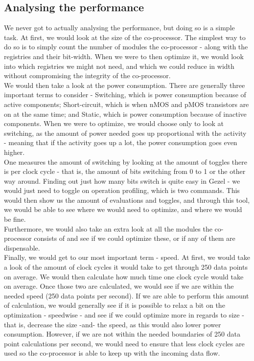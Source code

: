 \documentclass[12pt,a4paper]{article}
\begin{document}
\subsection{Analysing the performance}
	We never got to actually analysing the performance, but doing so is a simple task. At first, we would look at the size of the co-processor. The simplest way to do so is to simply count the number of modules the co-processor - along with the registries and their bit-width. When we were to then optimize it, we would look into which registries we might not need, and which we could reduce in width without compromising the integrity of the co-processor.\\
	We would then take a look at the power consumption. There are generally three important terms to consider - Switching, which is power consumption because of active components; Short-circuit, which is when nMOS and pMOS transistors are on at the same time; and Static, which is power consumption because of inactive components. When we were to optimize, we would choose only to look at switching, as the amount of power needed goes up proportional with the activity - meaning that if the activity goes up a lot, the power consumption goes even higher.\\
	One measures the amount of switching by looking at the amount of toggles there is per clock cycle - that is, the amount of bits switching from 0 to 1 or the other way around. Finding out just how many bits switch is quite easy in Gezel - we would just need to toggle on operation profiling, which is two commands. This would then show us the amount of evaluations and toggles, and through this tool, we would be able to see where we would need to optimize, and where we would be fine.\\
	Furthermore, we would also take an extra look at all the modules the co-processor consists of and see if we could optimize these, or if any of them are dispensable.\\
	Finally, we would get to our most important term - speed. At first, we would take a look of the amount of clock cycles it would take to get through 250 data points on average. We would then calculate how much time one clock cycle would take on average. Once those two are calculated, we would see if we are within the needed speed (250 data points per second). If we are able to perform this amount of calculation, we would generally see if it is possible to relax a bit on the optimization - speedwise - and see if we could optimize more in regards to size - that is, decrease the size -and- the speed, as this would also lower power consumption. However, if we are not within the needed boundaries of 250 data point calculations per second, we would need to ensure that less clock cycles are used so the co-processor is able to keep up with the incoming data flow.
\end{document}
